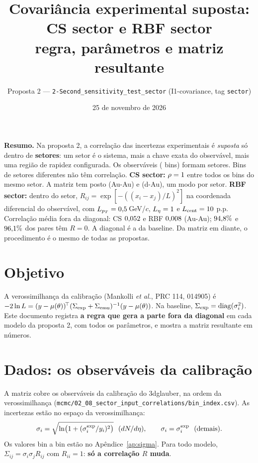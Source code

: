 \documentclass[11pt,a4paper]{article}
\title{Covariância experimental suposta: CS sector e RBF sector\\
\large regra, parâmetros e matriz resultante}
\date{25 de novembro de 2026}
\author{Proposta 2 --- \texttt{2-Second\_sensitivity\_test\_sector} \quad (I1-covariance, tag \texttt{sector})}
\newcommand{\arq}[1]{\texttt{\nolinkurl{#1}}}
\newcommand{\caixa}[2]{\par\noindent\colorbox{#1}{\parbox{\dimexpr\linewidth-2\fboxsep}{#2}}\par}
\begin{document}
\maketitle
\vspace{-1.5em}

\caixa{blue!6}{\textbf{Resumo.} Na proposta 2, a correlação das incertezas experimentais é \emph{suposta} só dentro de
\textbf{setores}: um setor é o sistema, mais a chave exata do observável, mais uma região de rapidez configurada. Os
\valNobs{} observáveis (\valNbins{} bins) formam \valNsectors{} setores. Bins de setores diferentes não têm correlação.
\textbf{CS sector:} $\rho=1$ entre todos os bins do mesmo setor. A matriz tem posto \valCsAuRank{} (Au-Au) e
\valCsDaRank{} (d-Au), um modo por setor.
\textbf{RBF sector:} dentro do setor, $R_{ij}=\exp[-((x_i-x_j)/L)^2]$ na coordenada diferencial do observável, com
$L_{p_T}=0{,}5$\,GeV/$c$, $L_\eta=1$ e $L_{\rm cent}=10$ p.p.
Correlação média fora da diagonal: CS $0{,}052$ e RBF $0{,}008$ (Au-Au); $94{,}8\%$ e $96{,}1\%$ dos
pares têm $R=0$. A diagonal é a da baseline. Da matriz em diante, o procedimento é o mesmo de todas as propostas.}

\section{Objetivo}
A verossimilhança da calibração (Mankolli \emph{et al.}, PRC 114, 014905) é
$-2\ln L=(y-\mu(\theta))^{\!\top}(\Sigma_{\rm exp}+\Sigma_{\rm emu})^{-1}(y-\mu(\theta))$. Na baseline,
$\Sigma_{\rm exp}={\rm diag}(\sigma_i^2)$. Este documento registra \textbf{a regra que gera a parte fora da diagonal} em
cada modelo da proposta 2, com todos os parâmetros, e mostra a matriz resultante em números.

\section{Dados: os observáveis da calibração}
A matriz cobre os \valNobs{} observáveis da calibração do 3dglauber, na ordem da verossimilhança
(\arq{mcmc/02_08_sector_input_correlations/bin_index.csv}). As incertezas estão no espaço da verossimilhança:
\begin{equation}
\sigma_i=\sqrt{\ln\!\big(1+(\sigma^{\rm exp}_i/y_i)^2\big)}\ \ (dN/d\eta),\qquad \sigma_i=\sigma^{\rm exp}_i\ \ (\text{demais}).
\end{equation}
Os valores bin a bin estão no Apêndice~\ref{ap:sigma}. Para todo modelo, $\Sigma_{ij}=\sigma_i\sigma_j R_{ij}$ com
$R_{ii}=1$: \textbf{só a correlação $R$ muda}.
\end{document}
